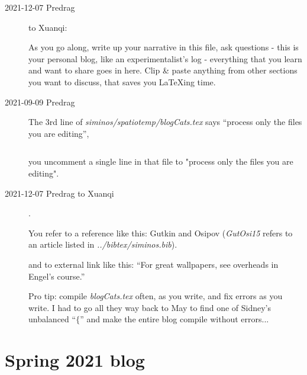 \begin{description}

\item[2021-12-07 Predrag] to Xuanqi:

As you go along, write up your narrative in this file, ask questions -
this is your personal blog, like an experimentalist's log - everything
that you learn and want to share goes in here.
Clip \& paste anything from other sections you
want to discuss, that saves you LaTeXing time.

\item[2021-09-09 Predrag]
The 3rd line of  \emph{siminos/spatiotemp/blogCats.tex}
says ``process only the files you are editing'',
\begin{verbatim}

\end{verbatim}
you uncomment a single line in that file to "process  only the files you
are editing".

\item[2021-12-07 Predrag to Xuanqi].




You refer to a reference like this: Gutkin and Osipov
(\emph{GutOsi15}
refers to an article listed in \emph{../bibtex/siminos.bib}).

and to external link like this:
``For great wallpapers, see overheads in
{Engel's} course.''

Pro tip: compile \emph{blogCats.tex} often, as you write, and fix errors as
you write. I had to go all they way back to May to find one of Sidney's
unbalanced ``$\{$'' and make the entire blog compile without errors...

\end{description}

\section{Spring 2021 blog}
\label{sect:xuanqi2021}

